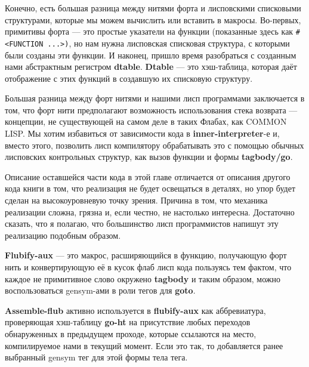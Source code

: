 Конечно, есть большая разница между нитями форта и лисповскими списковыми структурами, которые мы можем вычислить или вставить в макросы. Во-первых, примитивы форта --- это простые указатели на функции (показанные здесь как \verb|#<FUNCTION ...>)|, но нам нужна лисповская списковая структура, с которыми были созданы эти функции. И наконец, пришло время разобраться с созданным нами абстрактным регистром \textbf{dtable}. \textbf{Dtable} --- это хэш-таблица, которая даёт отображение с этих функций в создавшую их списковую структуру.

Большая разница между форт нитями и нашими лисп программами заключается в том, что форт нити предполагают возможность использования стека возврата --- концепции, не существующей на самом деле в таких Флабах, как COMMON LISP. Мы хотим избавиться от зависимости кода в \textbf{inner-interpreter}-е и, вместо этого, позволить лисп компилятору обрабатывать это с помощью обычных лисповских контрольных структур, как вызов функции и формы \textbf{tagbody/go}.

Описание оставшейся части кода в этой главе отличается от описания другого кода книги в том, что реализация не будет освещаться в деталях, но упор будет сделан на высокоуровневую точку зрения. Причина в том, что механика реализации сложна, грязна и, если честно, не настолько интересна. Достаточно сказать, что я полагаю, что большинство лисп программистов напишут эту реализацию подобным образом.

\textbf{Flubify-aux} --- это макрос, расширяющийся в функцию, получающую форт нить и конвертирующую её в кусок флаб лисп кода пользуясь тем фактом, что каждое не примитивное слово окружено \textbf{tagbody} и таким образом, можно воспользоваться gensym-ами в роли тегов для \textbf{goto}.

\textbf{Assemble-flub} активно используется в \textbf{flubify-aux} как аббревиатура, проверяющая хэш-таблицу \textbf{go-ht} на присутствие любых переходов обнаруженных в предыдущем проходе, которые ссылаются на место, компилируемое нами в текущий момент. Если это так, то добавляется ранее выбранный gensym тег для этой формы тела тега.

